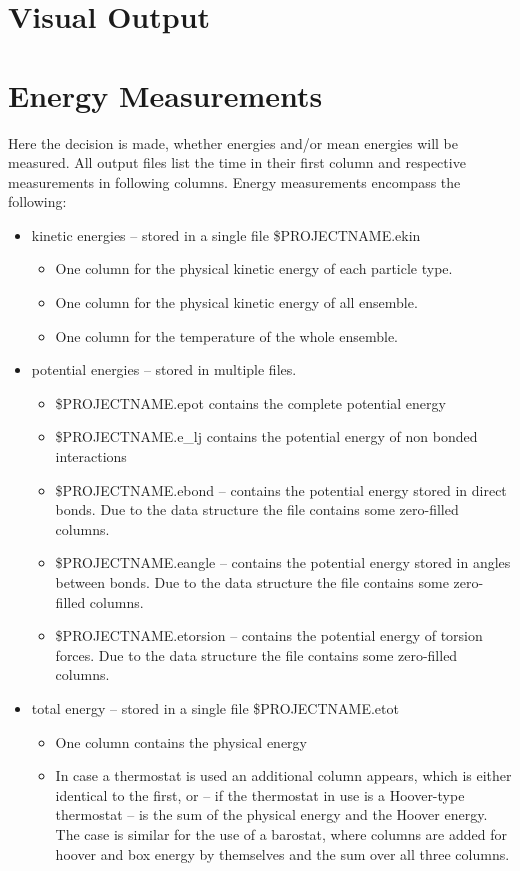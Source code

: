 \section{Visual Output}
\section{Energy Measurements}
Here the decision is made, whether energies and/or mean energies will be measured. All output files list the time in their first column and respective measurements in following columns.
Energy measurements encompass the following:
\begin{itemize}
\item kinetic energies -- stored in a single file \$PROJECTNAME.ekin
  \begin{itemize} 
    \item One column for the physical kinetic energy of each particle type.
    \item One column for the physical kinetic energy of all ensemble.
    \item One column for the temperature of the whole ensemble.
  \end{itemize}
\item potential energies -- stored in multiple files.
  \begin{itemize}
    \item \$PROJECTNAME.epot contains the complete potential energy
    \item \$PROJECTNAME.e\_lj contains the potential energy of non bonded interactions
    \item \$PROJECTNAME.ebond -- contains the potential energy stored in direct bonds. Due to the data structure the file contains some zero-filled columns.
    \item \$PROJECTNAME.eangle -- contains the potential energy stored in angles between bonds. Due to the data structure the file contains some zero-filled columns.
    \item \$PROJECTNAME.etorsion -- contains the potential energy of torsion forces. Due to the data structure the file contains some zero-filled columns.
  \end{itemize}
\item total energy -- stored in a single file \$PROJECTNAME.etot
  \begin{itemize}
    \item One column contains the physical energy
    \item In case a thermostat is used an additional column appears, which is either identical to the first, or -- if the thermostat in use is a
      Hoover-type thermostat -- is the sum of the physical energy and the Hoover energy. The case is similar for the use of a barostat, where columns are added for 
      hoover and box energy by themselves and the sum over all three columns.
  \end{itemize}
\end{itemize}
 
